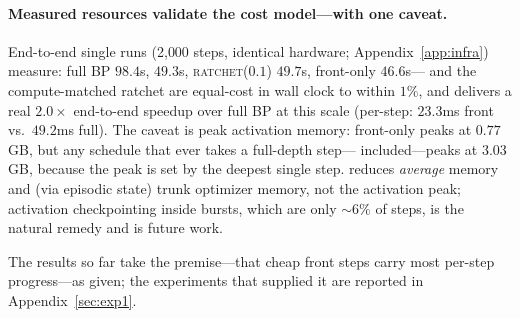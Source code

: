 \paragraph{Measured resources validate the cost model---with one caveat.}
End-to-end single runs (2{,}000 steps, identical hardware;
Appendix~\ref{app:infra}) measure: full BP $98.4$s, \fw{} $49.3$s,
\textsc{ratchet}($0.1$) $49.7$s, front-only $46.6$s---\fw{} and the
compute-matched ratchet are equal-cost in wall clock to within $1\%$, and
\fw{} delivers a real $2.0\times$ end-to-end speedup over full BP at this
scale (per-step: $23.3$ms front vs.\ $49.2$ms full). The caveat is peak
activation memory: front-only peaks at $0.77$\,GB, but any schedule that
ever takes a full-depth step---\fw{} included---peaks at $3.03$\,GB,
because the peak is set by the deepest single step. \fw{} reduces
\emph{average} memory and (via episodic state) trunk optimizer memory, not
the activation peak; activation checkpointing inside bursts, which are
only ${\sim}6\%$ of steps, is the natural remedy and is future work.

\noindent The results so far take the premise---that cheap front steps
carry most per-step progress---as given; the experiments that supplied it
are reported in Appendix~\ref{sec:exp1}.
